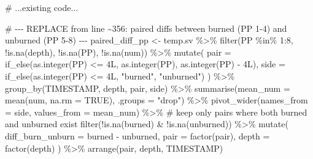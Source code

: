 \documentclass[
  letterpaper,
  DIV=11,
  numbers=noendperiod]{scrartcl}
\newenvironment{Shaded}{\begin{snugshade}}{\end{snugshade}}
\newcommand{\AttributeTok}[1]{\textcolor[rgb]{0.40,0.45,0.13}{#1}}
\newcommand{\CommentTok}[1]{\textcolor[rgb]{0.37,0.37,0.37}{#1}}
\newcommand{\ConstantTok}[1]{\textcolor[rgb]{0.56,0.35,0.01}{#1}}
\newcommand{\DecValTok}[1]{\textcolor[rgb]{0.68,0.00,0.00}{#1}}
\newcommand{\FunctionTok}[1]{\textcolor[rgb]{0.28,0.35,0.67}{#1}}
\newcommand{\NormalTok}[1]{\textcolor[rgb]{0.00,0.23,0.31}{#1}}
\newcommand{\OtherTok}[1]{\textcolor[rgb]{0.00,0.23,0.31}{#1}}
\newcommand{\SpecialCharTok}[1]{\textcolor[rgb]{0.37,0.37,0.37}{#1}}
\newcommand{\StringTok}[1]{\textcolor[rgb]{0.13,0.47,0.30}{#1}}
\begin{document}
\begin{Shaded}
\begin{Highlighting}[]
\CommentTok{\# ...existing code...}

\CommentTok{\# {-}{-}{-} REPLACE from line \textasciitilde{}356: paired diffs between burned (PP 1{-}4) and unburned (PP 5{-}8) {-}{-}{-}}
\NormalTok{paired\_diff\_pp }\OtherTok{\textless{}{-}}\NormalTok{ temp.sv }\SpecialCharTok{\%\textgreater{}\%}
  \FunctionTok{filter}\NormalTok{(PP }\SpecialCharTok{\%in\%} \DecValTok{1}\SpecialCharTok{:}\DecValTok{8}\NormalTok{, }\SpecialCharTok{!}\FunctionTok{is.na}\NormalTok{(depth), }\SpecialCharTok{!}\FunctionTok{is.na}\NormalTok{(PP), }\SpecialCharTok{!}\FunctionTok{is.na}\NormalTok{(num)) }\SpecialCharTok{\%\textgreater{}\%}
  \FunctionTok{mutate}\NormalTok{(}
    \AttributeTok{pair =} \FunctionTok{if\_else}\NormalTok{(}\FunctionTok{as.integer}\NormalTok{(PP) }\SpecialCharTok{\textless{}=} \DecValTok{4}\NormalTok{L, }\FunctionTok{as.integer}\NormalTok{(PP), }\FunctionTok{as.integer}\NormalTok{(PP) }\SpecialCharTok{{-}} \DecValTok{4}\NormalTok{L),}
    \AttributeTok{side =} \FunctionTok{if\_else}\NormalTok{(}\FunctionTok{as.integer}\NormalTok{(PP) }\SpecialCharTok{\textless{}=} \DecValTok{4}\NormalTok{L, }\StringTok{"burned"}\NormalTok{, }\StringTok{"unburned"}\NormalTok{)}
\NormalTok{  ) }\SpecialCharTok{\%\textgreater{}\%}
  \FunctionTok{group\_by}\NormalTok{(TIMESTAMP, depth, pair, side) }\SpecialCharTok{\%\textgreater{}\%}
  \FunctionTok{summarise}\NormalTok{(}\AttributeTok{mean\_num =} \FunctionTok{mean}\NormalTok{(num, }\AttributeTok{na.rm =} \ConstantTok{TRUE}\NormalTok{), }\AttributeTok{.groups =} \StringTok{"drop"}\NormalTok{) }\SpecialCharTok{\%\textgreater{}\%}
  \FunctionTok{pivot\_wider}\NormalTok{(}\AttributeTok{names\_from =}\NormalTok{ side, }\AttributeTok{values\_from =}\NormalTok{ mean\_num) }\SpecialCharTok{\%\textgreater{}\%}
  \CommentTok{\# keep only pairs where both burned and unburned exist}
  \FunctionTok{filter}\NormalTok{(}\SpecialCharTok{!}\FunctionTok{is.na}\NormalTok{(burned) }\SpecialCharTok{\&} \SpecialCharTok{!}\FunctionTok{is.na}\NormalTok{(unburned)) }\SpecialCharTok{\%\textgreater{}\%}
  \FunctionTok{mutate}\NormalTok{(}
    \AttributeTok{diff\_burn\_unburn =}\NormalTok{ burned }\SpecialCharTok{{-}}\NormalTok{ unburned,}
    \AttributeTok{pair =} \FunctionTok{factor}\NormalTok{(pair),}
    \AttributeTok{depth =} \FunctionTok{factor}\NormalTok{(depth)}
\NormalTok{  ) }\SpecialCharTok{\%\textgreater{}\%}
  \FunctionTok{arrange}\NormalTok{(pair, depth, TIMESTAMP)}


\end{Highlighting}
\end{Shaded}
\end{document}
